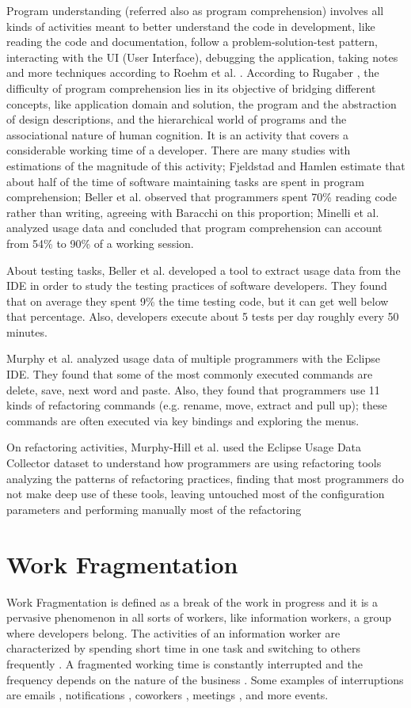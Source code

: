 Program understanding (referred also as program comprehension) involves all kinds of activities meant to better understand the code in development, like reading the code and documentation, follow a problem-solution-test pattern, interacting with the UI (User Interface), debugging the application, taking notes and more techniques according to Roehm et al. \cite{RTK12}. According to Rugaber \cite{R95}, the difficulty of program comprehension lies in its objective of bridging different concepts, like application domain and solution, the program and the abstraction of design descriptions, and the hierarchical world of programs and the associational nature of human cognition. It is an activity that covers a considerable working time of a developer. There are many studies with estimations of the magnitude of this activity; Fjeldstad and Hamlen \cite{FH83} estimate that about half of the time of software maintaining tasks are spent in program comprehension; Beller et al. \cite{BGZ15} observed that programmers spent 70\% reading code rather than writing, agreeing with Baracchi \cite{B14} on this proportion; Minelli et al. \cite{MMLK14} analyzed usage data and concluded that program comprehension can account from 54\% to 90\% of a working session.

About testing tasks, Beller et al. \cite{BGZ15} developed a tool to extract usage data from the IDE in order to study the testing practices of software developers. They found that on average they spent 9\% the time testing code, but it can get well below that percentage. Also, developers execute about 5 tests per day roughly every 50 minutes.

Murphy et al. \cite{MKF06} analyzed usage data of multiple programmers with the Eclipse IDE. They found that some of the most commonly executed commands are delete, save, next word and paste. Also, they found that programmers use 11 kinds of refactoring commands (e.g. rename, move, extract and pull up); these commands are often executed via key bindings and exploring the menus.

On refactoring activities, Murphy-Hill et al. \cite{MPB12} used the Eclipse Usage Data Collector dataset to understand how programmers are using refactoring tools analyzing the patterns of refactoring practices, finding that most programmers do not make deep use of these tools, leaving untouched most of the configuration parameters and performing manually most of the refactoring

\section{Work Fragmentation}
Work Fragmentation is defined as a break of the work in progress and it is a pervasive phenomenon in all sorts of workers, like information workers, a group where developers belong. The activities of an information worker are characterized by spending short time in one task and switching to others frequently \cite{MGH05}. A fragmented working time is constantly interrupted and the frequency depends on the nature of the business \cite{T99}. Some examples of interruptions are emails \cite{BJE05}, notifications \cite{CCH01}, coworkers \cite{LVD06}, meetings \cite{LR05}, and more events.

